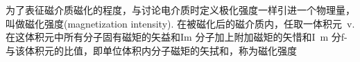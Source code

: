 
为了表征磁介质磁化的程度，与讨论电介质时定义极化强度一样引进一个物理量，叫做磁化强度(magnetization intensity). 在被磁化后的磁介质内，任取一体积元~v. 在这体积元中所有分子固有磁矩的矢益和Im 分子加上附加磁矩的矢惜和I~m 分f- 与该体积元的比值，即单位体积内分子磁矩的矢拭和，称为磁化强度 